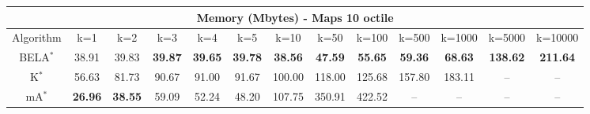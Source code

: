 \begin{tabular}{c|cccccccccccc}\toprule
\multicolumn{13}{c}{Memory (Mbytes) - Maps 10 octile}\\ \midrule
Algorithm & k=1 & k=2 & k=3 & k=4 & k=5 & k=10 & k=50 & k=100 & k=500 & k=1000 & k=5000 & k=10000 \\ \midrule
BELA$^*$ & 38.91 & 39.83 & \textbf{39.87} & \textbf{39.65} & \textbf{39.78} & \textbf{38.56} & \textbf{47.59} & \textbf{55.65} & \textbf{59.36} & \textbf{68.63} & \textbf{138.62} & \textbf{211.64} \\
K$^*$ & 56.63 & 81.73 & 90.67 & 91.00 & 91.67 & 100.00 & 118.00 & 125.68 & 157.80 & 183.11 & -- & -- \\
mA$^*$ & \textbf{26.96} & \textbf{38.55} & 59.09 & 52.24 & 48.20 & 107.75 & 350.91 & 422.52 & -- & -- & -- & -- \\ \bottomrule 
\end{tabular}
